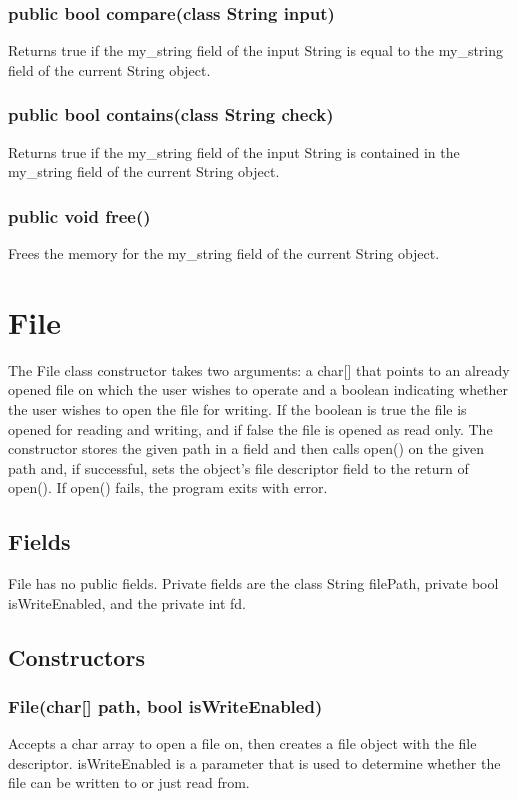 \begin{homeworkProblem}
    \subsubsection{public bool compare(class String input)}
    Returns true if the my_string field of the input String is equal to the my_string field of the current String object.
    \subsubsection{public bool contains(class String check)}
    Returns true if the my_string field of the input String is contained in the my_string field of the current String object.
    \subsubsection{public void free()}
    Frees the memory for the my_string field of the current String object.

	\section{File}
	The File class constructor takes two arguments: a char[] that points to an already opened file on which the user wishes to operate and a boolean indicating whether the user wishes to open the file for writing. If the boolean is true the file is opened for reading and writing, and if false the file is opened as read only. The constructor stores the given path in a field and then calls open() on the given path and, if successful, sets the object’s file descriptor field to the return of open(). If open() fails, the program exits with error.
	\subsection{Fields}
	File has no public fields. Private fields are the class String filePath, private bool isWriteEnabled, and the private int fd.

	\subsection{Constructors}
	\subsubsection{File(char[] path, bool isWriteEnabled)}
	Accepts a char array to open a file on, then creates a file object with the file descriptor. isWriteEnabled is a parameter that is used to determine whether the file can be written to or just read from.


\end{homeworkProblem}
